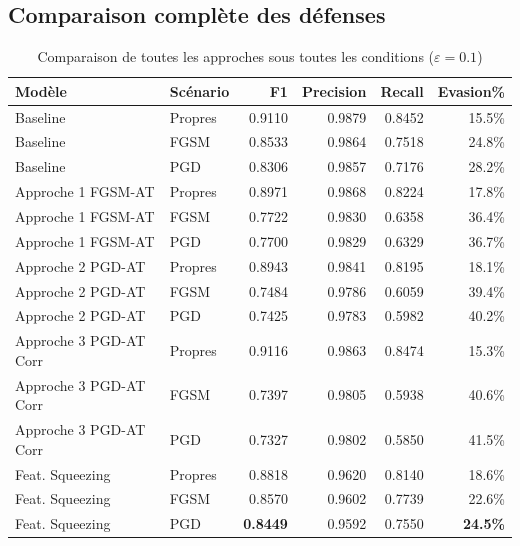 \documentclass[11pt,a4paper]{article}
\begin{document}
\subsection{Comparaison compl\`ete des d\'efenses}

\begin{table}[H]
\centering
\caption{Comparaison de toutes les approches sous toutes les conditions ($\varepsilon=0.1$)}
\begin{tabular}{llrrrr}
\toprule
\textbf{Mod\`ele} & \textbf{Sc\'enario} & \textbf{F1} & \textbf{Precision} & \textbf{Recall} & \textbf{Evasion\%} \\
\midrule
Baseline             & Propres & 0.9110 & 0.9879 & 0.8452 & 15.5\% \\
Baseline             & FGSM    & 0.8533 & 0.9864 & 0.7518 & 24.8\% \\
Baseline             & PGD     & 0.8306 & 0.9857 & 0.7176 & 28.2\% \\
\midrule
Approche 1 FGSM-AT   & Propres & 0.8971 & 0.9868 & 0.8224 & 17.8\% \\
Approche 1 FGSM-AT   & FGSM    & 0.7722 & 0.9830 & 0.6358 & 36.4\% \\
\rowcolor{myred!10}
Approche 1 FGSM-AT   & PGD     & 0.7700 & 0.9829 & 0.6329 & 36.7\% \\
\midrule
Approche 2 PGD-AT    & Propres & 0.8943 & 0.9841 & 0.8195 & 18.1\% \\
Approche 2 PGD-AT    & FGSM    & 0.7484 & 0.9786 & 0.6059 & 39.4\% \\
\rowcolor{myred!15}
Approche 2 PGD-AT    & PGD     & 0.7425 & 0.9783 & 0.5982 & 40.2\% \\
\midrule
Approche 3 PGD-AT Corr & Propres & 0.9116 & 0.9863 & 0.8474 & 15.3\% \\
Approche 3 PGD-AT Corr & FGSM    & 0.7397 & 0.9805 & 0.5938 & 40.6\% \\
\rowcolor{myred!20}
Approche 3 PGD-AT Corr & PGD     & 0.7327 & 0.9802 & 0.5850 & \alert{41.5\%} \\
\midrule
Feat. Squeezing      & Propres & 0.8818 & 0.9620 & 0.8140 & 18.6\% \\
Feat. Squeezing      & FGSM    & 0.8570 & 0.9602 & 0.7739 & 22.6\% \\
\rowcolor{green!15}
Feat. Squeezing      & PGD     & \textbf{0.8449} & 0.9592 & 0.7550 & \textbf{24.5\%} \\
\bottomrule
\end{tabular}
\end{table}
\end{document}
